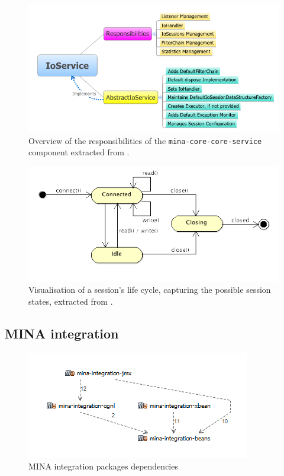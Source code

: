 \begin{figure}[H]
    \centering
    \includegraphics[width=\textwidth]{images/IoService_mindmap.png}
    \caption{Overview of the responsibilities of the \texttt{mina-core-core-service} component extracted from \cite{mina-userguide}.}
    \label{fig:service_responisbilities}
\end{figure}

\begin{figure}[H]
    \centering
    \includegraphics[width=\textwidth]{images/session-state.png}
    \caption{Visualisation of a session's life cycle, capturing the possible session states, extracted from \cite{mina-userguide}.}
    \label{fig:session_lifecycle}
\end{figure}


\subsection{MINA integration}

\begin{figure}[H]
    \centering
    \includegraphics{images/MINA_integration_dependencies.png}
    \caption{MINA integration packages dependencies}
    \label{fig:dependencies_integration}
\end{figure}

